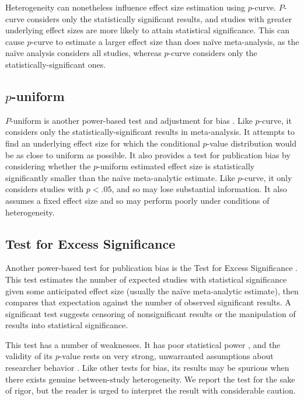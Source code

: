 \documentclass[man, mask]{apa6}
\begin{document}
Heterogeneity can nonetheless influence effect size estimation using $p$-curve. $P$-curve considers only the statistically significant results, and studies with greater underlying effect sizes are more likely to attain statistical significance. This can cause $p$-curve to estimate a larger effect size than does na{\"i}ve meta-analysis, as the na{\"i}ve analysis considers all studies, whereas $p$-curve considers only the statistically-significant ones. 

\subsection{$p$-uniform}
$P$-uniform is another power-based test and adjustment for bias \citep{vanAssen:etal:2015}. Like $p$-curve, it considers only the statistically-significant results in meta-analysis. It attempts to find an underlying effect size for which the conditional $p$-value distribution would be as close to uniform as possible. It also provides a test for publication bias by considering whether the $p$-uniform estimated effect size is statistically significantly smaller than the na{\"i}ve meta-analytic estimate. Like $p$-curve, it only considers studies with $p < .05$, and so may lose substantial information. It also assumes a fixed effect size and so may perform poorly under conditions of heterogeneity.

\subsection{Test for Excess Significance}
Another power-based test for publication bias is the Test for Excess Significance \citep{Ioannidis:Trikalinos:2007}. This test estimates the number of expected studies with statistical significance given some anticipated effect size (usually the na{\"i}ve meta-analytic estimate), then compares that expectation against the number of observed significant results. A significant test suggests censoring of nonsignificant results or the manipulation of results into statistical significance.

This test has a number of weaknesses. It has poor statistical power \citep{Ioannidis:Trikalinos:2007}, and the validity of its $p$-value rests on very strong, unwarranted assumptions about researcher behavior \citep{Morey:2013}. Like other tests for bias, its results may be spurious when there exists genuine between-study heterogeneity. We report the test for the sake of rigor, but the reader is urged to interpret the result with considerable caution.
\end{document}
